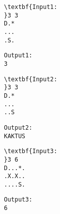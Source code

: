 \begin{verbatim}
\textbf{Input1:
}3 3
D.*
...
.S.\end{verbatim}
\begin{verbatim}
Output1:
3\end{verbatim}
\begin{verbatim}
\textbf{Input2:
}3 3
D.*
...
..S\end{verbatim}
\begin{verbatim}
Output2:
KAKTUS\end{verbatim}
\begin{verbatim}
\textbf{Input3:
}3 6
D...*.
.X.X..
....S.\end{verbatim}
\begin{verbatim}
Output3:
6\end{verbatim}